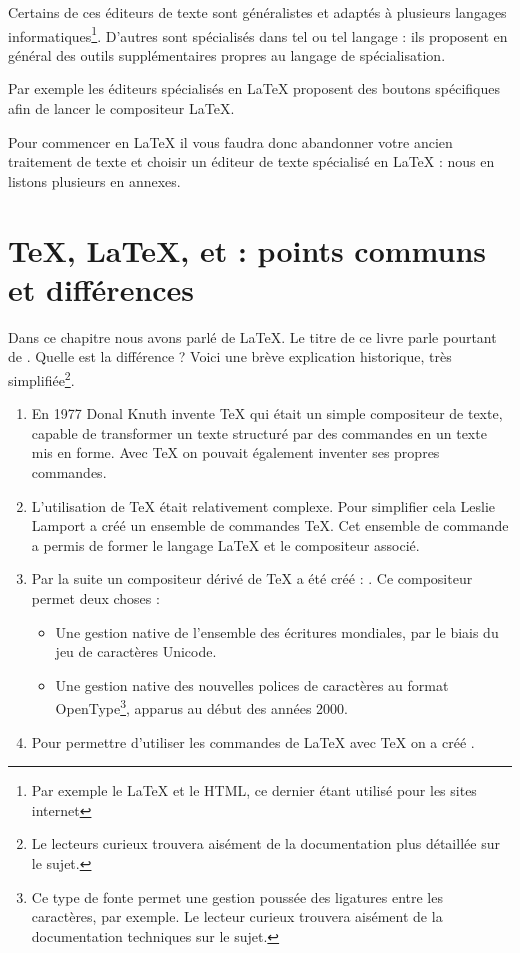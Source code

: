 Certains de ces éditeurs de texte sont généralistes et adaptés à plusieurs langages informatiques\footnote{Par exemple le \LaTeX{} et le HTML, ce dernier étant utilisé pour les sites internet}. D'autres sont spécialisés dans tel ou tel langage : ils proposent en général des outils supplémentaires propres au langage de spécialisation. 

Par exemple les éditeurs spécialisés en \LaTeX{} proposent des boutons spécifiques afin de lancer le compositeur \LaTeX{}.

Pour commencer en \LaTeX{} il vous faudra donc abandonner votre ancien traitement de texte et choisir un éditeur de texte spécialisé en \LaTeX{} : nous en listons plusieurs en annexes.

\section[TeX, LaTeX, XeTeX, XeLaTeX : points communs et différences]{\TeX{}, \LaTeX{}, \XeTeX{} et \XeLaTeX{} : points communs et différences}

Dans ce chapitre nous avons parlé de \LaTeX{}. Le titre de ce livre parle pourtant  de \XeLaTeX{}. Quelle est la différence ? Voici une brève explication historique, très simplifiée\footnote{Le lecteurs curieux trouvera aisément de la documentation plus détaillée sur le sujet.}.

\begin{enumerate}
\item En 1977 Donal Knuth invente  \TeX{} qui était un simple compositeur de texte, capable de transformer un texte structuré par des commandes en un texte mis en forme. Avec \TeX{} on pouvait également inventer ses propres commandes.
\item L'utilisation de \TeX{} était relativement complexe. Pour simplifier cela Leslie Lamport a créé un ensemble de commandes \TeX{}. Cet ensemble de commande a permis de former le langage \LaTeX{} et le compositeur associé.
\item Par la suite un compositeur dérivé de \TeX{} a été créé : \XeTeX{}. Ce compositeur permet deux choses :
\begin{itemize}
	\item Une gestion native de l'ensemble des écritures mondiales, par le biais du jeu de caractères Unicode.
	\item Une gestion native des nouvelles polices de caractères au format OpenType\footnote{Ce type de fonte permet une gestion poussée des ligatures entre les caractères, par exemple. Le lecteur curieux trouvera aisément de la documentation techniques sur le sujet.}, apparus au début des années 2000.

\end{itemize} 
\item Pour permettre d'utiliser les commandes de \LaTeX{} avec \TeX{} on a créé \XeLaTeX{}.
\end{enumerate}

